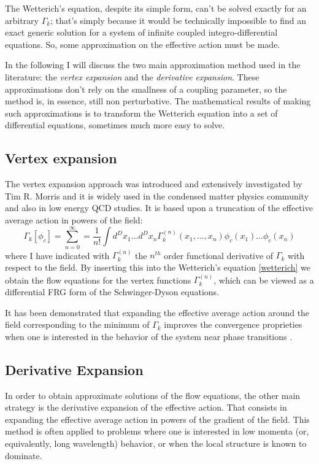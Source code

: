 The Wetterich's equation, despite its simple form, can't be solved exactly for an arbitrary $\Gamma_k$; that's simply because it
would be technically impossible to find an exact generic solution for a system of infinite coupled integro-differential equations.
So, some approximation on the effective action must be made.

In the following I will discuss the two main approximation method used in the literature: the \emph{vertex expansion} and the \emph{derivative expansion}.
These approximations don't rely on the smallness of a coupling parameter, so the method is, in essence, still  non perturbative. 
The mathematical results of making such approximations is to transform the Wetterich equation into a set of differential equations, 
sometimes much more easy to solve.



\subsection{Vertex expansion}
The vertex expansion approach was introduced and  extensively investigated by Tim R. Morris \cite{verticemorris} and it is widely used in the 
condensed matter physics community and also in low energy QCD studies. It is based upon a truncation of the effective average action in powers of the field:
\begin{equation}
 \Gamma_k[\phi_c] = \sum_{n = 0}^\infty = \frac{1}{n!}\int d^D x_1 \dots d^Dx_n \Gamma_k^{(n)}(x_1, \dots, x_n)\phi_c(x_1)\dots\phi_c(x_n)
\end{equation}
where I have indicated with $\Gamma_k^{(n)}$ the $n^{th}$ order functional derivative of $\Gamma_k$ with respect to the field.
By inserting this into the Wetterich's equation \eqref{wetterich} we obtain the flow equations for the vertex functions $\Gamma_k^{(n)}$, which
can be viewed as a differential FRG form of the Schwinger-Dyson equations.

It has been demonstrated that expanding the effective average action around the field corresponding to  the minimum of $\Gamma_k$ improves 
the convergence proprieties when one is interested in the behavior of the system near phase transitions \cite{verticefasi}.  

\subsection{Derivative Expansion}
In order to obtain approximate solutions of the flow equations, the other main strategy is the derivative expansion of the effective action.
That consists in expanding the effective average action in powers of the gradient of the field. 
This method is often applied to problems where one is interested in low momenta (or, equivalently, long wavelength) behavior,
or when the local structure is known to dominate.

